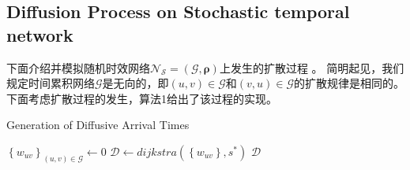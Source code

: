 \documentclass[journal]{IEEEtran}
\begin{document}
		\subsection{Diffusion Process on Stochastic temporal network}
		下面介绍并模拟随机时效网络$\mathcal{N_S=(G,\bm{\rho})}$上发生的扩散过程 。
		简明起见，我们规定时间累积网络$\mathcal{G}$是无向的，即$(u,v)\in \mathcal{G}$和$(v,u)\in \mathcal{G}$的扩散规律是相同的。
		下面考虑扩散过程的发生，算法1给出了该过程的实现。
		\begin{algorithm}
			\caption{Generation of Diffusive Arrival Times}
			\LinesNumbered  
			
			$\left\{w_{uv}\right\}_{(u,v)\in \mathcal{G}} \gets 0$\;	
			$\mathcal{D} \gets dijkstra(\left\{w_{uv} \right\},s^*)$\;
			\Return $\mathcal{D}$\;
		\end{algorithm}	
\end{document}
